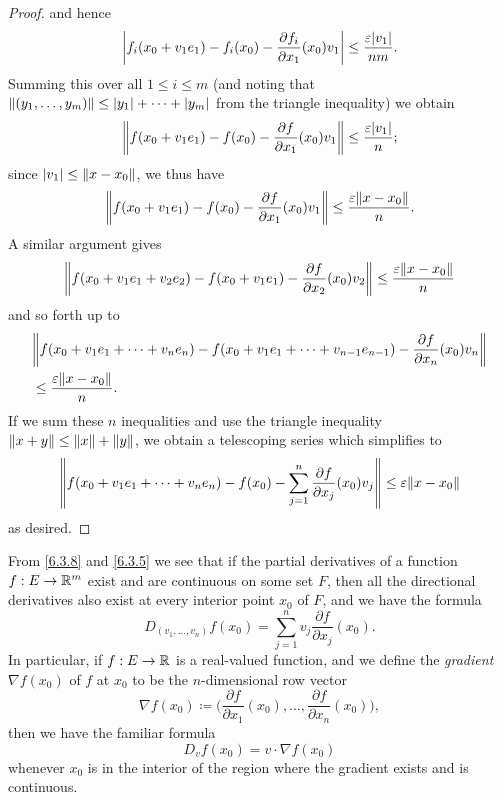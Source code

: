 \begin{proof}
  and hence
  \[
    \abs{f_i(x_0 + v_1 e_1) - f_i(x_0) - \dfrac{\partial f_i}{\partial x_1}(x_0) v_1} \leq \dfrac{\varepsilon \abs{v_1}}{nm}.
  \]
  Summing this over all \(1 \leq i \leq m\) (and noting that \(\norm*{(y_1, \dots, y_m)} \leq \abs{y_1} + \dots + \abs{y_m}\) from the triangle inequality) we obtain
  \[
    \norm*{f(x_0 + v_1 e_1) - f(x_0) - \dfrac{\partial f}{\partial x_1}(x_0) v_1} \leq \dfrac{\varepsilon \abs{v_1}}{n};
  \]
  since \(\abs{v_1} \leq \norm*{x - x_0}\), we thus have
  \[
    \norm*{f(x_0 + v_1 e_1) - f(x_0) - \dfrac{\partial f}{\partial x_1}(x_0) v_1} \leq \dfrac{\varepsilon \norm*{x - x_0}}{n}.
  \]
  A similar argument gives
  \[
    \norm*{f(x_0 + v_1 e_1 + v_2 e_2) - f(x_0 + v_1 e_1) - \dfrac{\partial f}{\partial x_2}(x_0) v_2} \leq \dfrac{\varepsilon \norm*{x - x_0}}{n}
  \]
  and so forth up to
  \begin{align*}
     & \norm*{f(x_0 + v_1 e_1 + \dots + v_n e_n) - f(x_0 + v_1 e_1 + \dots + v_{n - 1} e_{n - 1}) - \dfrac{\partial f}{\partial x_n}(x_0) v_n} \\
     & \leq \dfrac{\varepsilon \norm*{x - x_0}}{n}.
  \end{align*}
  If we sum these \(n\) inequalities and use the triangle inequality \(\norm*{x + y} \leq \norm*{x} + \norm*{y}\), we obtain a telescoping series which simplifies to
  \[
    \norm*{f(x_0 + v_1 e_1 + \dots + v_n e_n) - f(x_0) - \sum_{j = 1}^n \dfrac{\partial f}{\partial x_j}(x_0) v_j} \leq \varepsilon \norm*{x - x_0}
  \]
  as desired.
\end{proof}

\begin{ac}\label{ac:6.3.3}
  From \cref{6.3.8} and \cref{6.3.5} we see that if the partial derivatives of a function \(f : E \to \R^m\) exist and are continuous on some set \(F\), then all the directional derivatives also exist at every interior point \(x_0\) of \(F\), and we have the formula
  \[
    D_{(v_1, \dots, v_n)} f(x_0) = \sum_{j = 1}^n v_j \dfrac{\partial f}{\partial x_j}(x_0).
  \]
  In particular, if \(f : E \to \R\) is a real-valued function, and we define the \emph{gradient} \(\nabla f(x_0)\) of \(f\) at \(x_0\) to be the \(n\)-dimensional row vector
  \[
    \nabla f(x_0) \coloneqq \bigg(\dfrac{\partial f}{\partial x_1}(x_0), \dots, \dfrac{\partial f}{\partial x_n}(x_0)\bigg),
  \]
  then we have the familiar formula
  \[
    D_v f(x_0) = v \cdot \nabla f(x_0)
  \]
  whenever \(x_0\) is in the interior of the region where the gradient exists and is continuous.
\end{ac}

